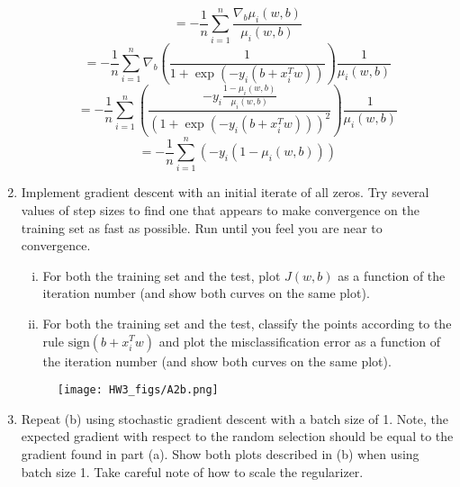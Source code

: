 \documentclass{article}
\begin{document}
\begin{aprob}
\begin{enumerate}
        \begin{equation*}
        = -\frac{1}{n} \sum_{i=1}^n \frac{\nabla_b \mu_i(w,b)}{\mu_i(w,b)}
        \end{equation*}
        \begin{equation*}
        = -\frac{1}{n} \sum_{i=1}^n \nabla_b \left( \frac{1}{1 + \exp(-y_i (b + x_i^T w))} \right) \frac{1}{\mu_i(w,b)}
        \end{equation*}
        \begin{equation*}
        = -\frac{1}{n} \sum_{i=1}^n \left( \frac{-y_i \frac{1 - \mu_i(w,b)}{\mu_i(w,b)}}{(1 + \exp(-y_i (b + x_i^T w)))^2} \right) \frac{1}{\mu_i(w,b)} 
        \end{equation*}
        \begin{equation*}
        = -\frac{1}{n} \sum_{i=1}^n (-y_i (1- \mu_i(w,b)))
        \end{equation*}
        
        
        \item {} Implement gradient descent with an initial iterate of all zeros. Try several values of step sizes to find one that appears to make convergence on the training set as fast as possible. Run until you feel you are near to convergence.
        \begin{enumerate}[(i)]
            \item For both the training set and the test, plot $J(w,b)$ as a function of the iteration number (and show both curves on the same plot).  
            \item For both the training set and the test, classify the points according to the rule $\text{sign}(b + x_i^T w)$ and plot the misclassification error as a function of the iteration number (and show both curves on the same plot). 
        \end{enumerate}
        
        \begin{figure}[htp] 
        \centering
        \vspace*{-0.1in}
        \texttt{[image: HW3\_figs/A2b.png]}
        \label{figs:A2b.png}
        \end{figure}
          
        \item {} Repeat (b) using stochastic gradient descent with a batch size of 1. Note, the expected gradient with respect to the random selection should be equal to the gradient found in part (a). Show both plots described in (b) when using batch size 1. Take careful note of how to scale the regularizer.
        

\end{enumerate}
\end{aprob}
\end{document}
